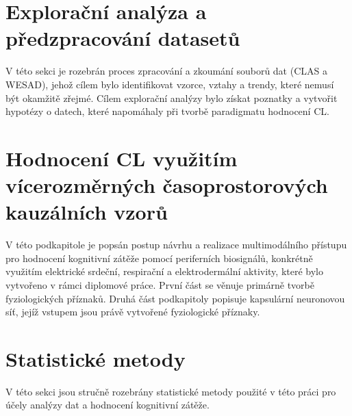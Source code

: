 \section{Explorační analýza a předzpracování datasetů}
\label{sec:exploracni_analyza}
V této sekci je rozebrán proces zpracování a zkoumání souborů dat (CLAS a
WESAD), jehož cílem bylo identifikovat vzorce, vztahy a trendy, které nemusí být
okamžitě zřejmé. Cílem explorační analýzy bylo získat poznatky a vytvořit
hypotézy o datech, které napomáhaly při tvorbě paradigmatu hodnocení \gls{CL}.


\section[Hodnocení kognitivní zátěže využitím vícerozměrných \\ časoprostorových kauzálních vzorů][Hodnocení CL využitím vícerozměrných časoprostorových kauzálních vzorů]{Hodnocení CL využitím vícerozměrných časoprostorových kauzálních vzorů}
\label{sec:hybridni_detekce}
V této podkapitole je popsán postup návrhu a realizace multimodálního přístupu
pro hodnocení kognitivní zátěže pomocí periferních biosignálů, konkrétně
využitím elektrické srdeční, respirační a elektrodermální aktivity, které bylo
vytvořeno v rámci diplomové práce. První část se věnuje primárně tvorbě
fyziologických příznaků. Druhá část podkapitoly popisuje kapsulární neuronovou
síť, jejíž vstupem jsou právě vytvořené fyziologické příznaky.


\section{Statistické metody}
\label{sec:statisticke_metody}
V této sekci jsou stručně rozebrány statistické metody použité v této práci pro
účely analýzy dat a hodnocení kognitivní zátěže.


% 

% 

